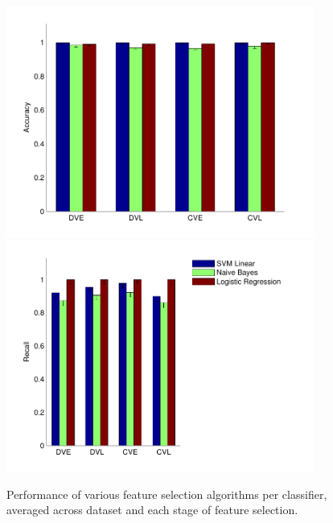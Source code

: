 \begin{figure}[tbp!]
\centering
\includegraphics[width=0.9\textwidth]{./figures/class_perf/Accuracy.pdf}\\
\includegraphics[width=0.9\textwidth]{./figures/class_perf/Recall.pdf}
\caption{\footnotesize Performance of various feature selection algorithms per classifier, averaged across dataset and each stage of feature selection.}
\label{fig:perf_vs_classifier}
\end{figure}

